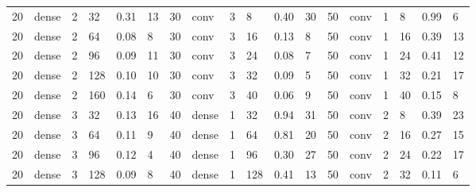 \begin{table}[t!]
{\begin{tabular}{@{}llllll|llllll|llllll@{}}
20          & dense      & 2          & 32         & 0.31         & 13           & 30          & conv       & 3          & 8          & 0.40         & 30           & 50          & conv       & 1          & 8          & 0.99         & 6            \\
20          & dense      & 2          & 64         & 0.08         & 8            & 30          & conv       & 3          & 16         & 0.13         & 8            & 50          & conv       & 1          & 16         & 0.39         & 13           \\
20          & dense      & 2          & 96         & 0.09         & 11           & 30          & conv       & 3          & 24         & 0.08         & 7            & 50          & conv       & 1          & 24         & 0.41         & 12           \\
20          & dense      & 2          & 128        & 0.10         & 10           & 30          & conv       & 3          & 32         & 0.09         & 5            & 50          & conv       & 1          & 32         & 0.21         & 17           \\
20          & dense      & 2          & 160        & 0.14         & 6            & 30          & conv       & 3          & 40         & 0.06         & 9            & 50          & conv       & 1          & 40         & 0.15         & 8            \\
20          & dense      & 3          & 32         & 0.13         & 16           & 40          & dense      & 1          & 32         & 0.94         & 31           & 50          & conv       & 2          & 8          & 0.39         & 23           \\
20          & dense      & 3          & 64         & 0.11         & 9            & 40          & dense      & 1          & 64         & 0.81         & 20           & 50          & conv       & 2          & 16         & 0.27         & 15           \\
20          & dense      & 3          & 96         & 0.12         & 4            & 40          & dense      & 1          & 96         & 0.30         & 27           & 50          & conv       & 2          & 24         & 0.22         & 17           \\
20          & dense      & 3          & 128        & 0.09         & 8            & 40          & dense      & 1          & 128        & 0.41         & 13           & 50          & conv       & 2          & 32         & 0.11         & 6            \\

\end{tabular}}
\end{table}
